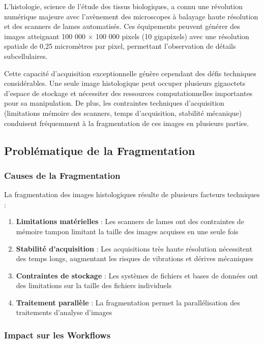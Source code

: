 \documentclass[12pt,a4paper]{report}
\begin{document}
L'histologie, science de l'étude des tissus biologiques, a connu une révolution numérique majeure avec l'avènement des microscopes à balayage haute résolution et des scanners de lames automatisés. Ces équipements peuvent générer des images atteignant 100 000 × 100 000 pixels (10 gigapixels) avec une résolution spatiale de 0,25 micromètres par pixel, permettant l'observation de détails subcellulaires.

Cette capacité d'acquisition exceptionnelle génère cependant des défis techniques considérables. Une seule image histologique peut occuper plusieurs gigaoctets d'espace de stockage et nécessiter des ressources computationnelles importantes pour sa manipulation. De plus, les contraintes techniques d'acquisition (limitations mémoire des scanners, temps d'acquisition, stabilité mécanique) conduisent fréquemment à la fragmentation de ces images en plusieurs parties.

\subsection{Problématique de la Fragmentation}

\subsubsection{Causes de la Fragmentation}

La fragmentation des images histologiques résulte de plusieurs facteurs techniques :

\begin{enumerate}
\item \textbf{Limitations matérielles} : Les scanners de lames ont des contraintes de mémoire tampon limitant la taille des images acquises en une seule fois
\item \textbf{Stabilité d'acquisition} : Les acquisitions très haute résolution nécessitent des temps longs, augmentant les risques de vibrations et dérives mécaniques
\item \textbf{Contraintes de stockage} : Les systèmes de fichiers et bases de données ont des limitations sur la taille des fichiers individuels
\item \textbf{Traitement parallèle} : La fragmentation permet la parallélisation des traitements d'analyse d'images
\end{enumerate}

\subsubsection{Impact sur les Workflows}
\end{document}
